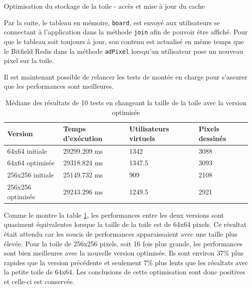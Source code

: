 \begin{listing}[H]
  \inputminted[highlightlines={9,21},linenos]{ts}{assets/figures/opti-storage-2.ts}
  \caption{Optimisation du stockage de la toile - accès et mise à jour du cache}
  \label{listing:opti-storage-2}
\end{listing}

Par la suite, le tableau en mémoire, \texttt{board}, est envoyé aux utilisateurs se connectant à l'application dans la méthode \texttt{join} afin de pouvoir être affiché. Pour que le tableau soit toujours à jour, son contenu est actualisé en même temps que le Bitfield Redis dans la méthode \texttt{adPixel} lorsqu'un utilisateur pose un nouveau pixel sur la toile.

Il est maintenant possible de relancer les tests de montée en charge pour s'assurer que les performances sont meilleures.

\begin{table}[H]
  \centering
  \begin{tabular}{|l|l|l|l|}
    \hline
    \textbf{Version}  & \textbf{Temps d'exécution} & \textbf{Utilisateurs virtuels} & \textbf{Pixels dessinés} \\ \hline
    64x64 initiale    & 29299.209 ms               & 1342                           & 3088                     \\ \hline
    64x64 optimisée   & 29318.824 ms               & 1347.5                         & 3093                     \\ \Xhline{4\arrayrulewidth}
    256x256 initiale  & 25149.732 ms               & 909                            & 2108                     \\ \hline
    256x256 optimisée & 29243.296 ms               & 1249.5                         & 2921                     \\ \hline
  \end{tabular}
  \caption{Médiane des résultats de 10 tests en changeant la taille de la toile avec la version optimisée}
  \label{table:canvas-size-results-optimized}
\end{table}

Comme le montre la table \ref{table:canvas-size-results-optimized}, les performances entre les deux versions sont quasiment équivalentes lorsque la taille de la toile est de 64x64 pixels. Ce résultat était attendu car les soucis de performances apparaissaient avec une taille plus élevée. Pour la toile de 256x256 pixels, soit 16 fois plus grande, les performances sont bien meilleures avec la nouvelle version optimisée. Ils sont environ 37\% plus rapides que la version précédente et seulement 7\% plus lents que les résultats avec la petite toile de 64x64. Les conclusions de cette optimisation sont donc positives et celle-ci est conservée.

